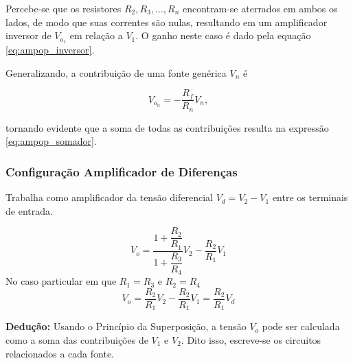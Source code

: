 \documentclass{article}
\numberwithin{equation}{section}
\let\dfr\dfrac
\begin{document}
Percebe-se que os resistores $R_2, R_3, \dots, R_n$ encontram-se aterrados em ambos os lados, de modo que suas correntes são nulas, resultando em um amplificador inversor de $V_{o_1}$ em relação a $V_1$. O ganho neste caso é dado pela equação \eqref{eq:ampop_inversor}.

Generalizando, a contribuição de uma fonte genérica $V_n$ é

\begin{equation}
    V_{o_n} = - \dfr{R_f}{R_n}V_n,
\end{equation}

\noindent tornando evidente que a soma de todas as contribuições resulta na expressão \eqref{eq:ampop_somador}.

\subsubsection{Configuração Amplificador de Diferenças}
Trabalha como amplificador da tensão diferencial $V_{d}=V_{2}-V_{1}$ entre os terminais de entrada.

\begin{center}
\end{center}

\begin{equation*}
    V_{o}=\frac{1+\dfr{R_{2}}{R_{1}}}{1+\dfr{R_{3}}{R_{4}}}V_{2} - \dfr{R_{2}}{R_{1}}V_{1}
\end{equation*}
No caso particular em que $R_{1}=R_{3}$ e $R_{2}=R_{4}$
\begin{equation}
    V_{o}=\frac{R_{2}}{R_{1}}V_{2}-\frac{R_{2}}{R_{1}}V_{1}=\frac{R_{2}}{R_{1}}V_{d} \label{eq:ampop_diferencas}
\end{equation}

\textbf{Dedução:} Usando o Princípio da Superposição, a tensão $V_o$ pode ser calculada como a soma das contribuições de $V_1$ e $V_2$. Dito isso, escreve-se os circuitos relacionados a cada fonte.
\end{document}
